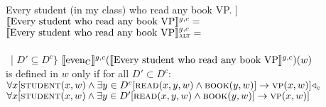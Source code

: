 \pex\label{ex:any-sdm-demo}
\a Every student (in my class) who read any book VP.
\a[] [even\textsubscript{C} [every student who read any book VP]]
\a $\intension[g,c]{Every student who read any book VP}=$\\
\a $\intension[g,c]{Every student who read any book VP}_{\text{\scshape alt}}=$\\\\\emptyfill~| $D'\subseteq D^c\}$
\a $\intension[g,c]{even\textsubscript{C}}(\intension[g,c]{Every student who read any book VP})(w)$\\is defined in $w$ only if for all $D'\subset D^c$:\\$\forall{x}[\predicate{student}(x,w)\land\exists{y\in{D^c}}[\predicate{read}(x,y,w)\land\predicate{book}(y,w)]\rightarrow\predicate{vp}(x,w)]\lprob_c$\\$\forall{x}[\predicate{student}(x,w)\land\exists{y\in{D'}}[\predicate{read}(x,y,w)\land\predicate{book}(y,w)]\rightarrow\predicate{vp}(x,w)]$
\xe

